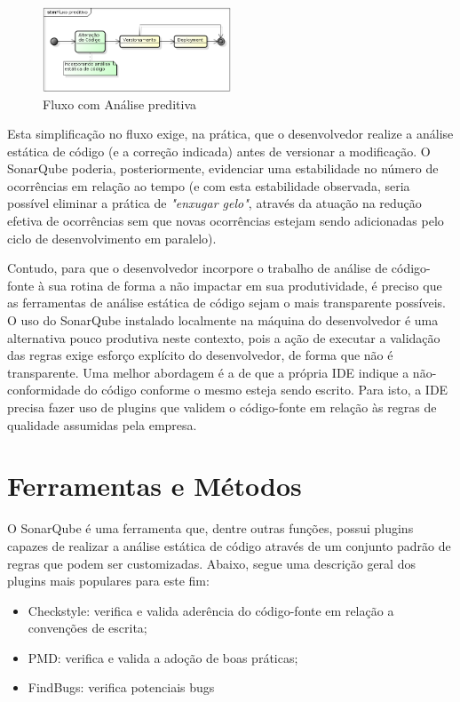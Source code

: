 \documentclass[12pt,journal,compsoc]{IEEEtran}
\begin{document}
\begin{figure}[ht!]
\centering
\includegraphics[width=0.5\textwidth]{img/flow_after}
\caption{Fluxo com Análise preditiva}
\label{flow_after}
\end{figure}

Esta simplificação no fluxo exige, na prática, que o desenvolvedor realize a análise estática de código (e a correção indicada) antes de versionar a modificação\cite{jamesshore_ci_attitude}. O SonarQube poderia, posteriormente, evidenciar uma estabilidade no número de ocorrências em relação ao tempo (e com esta estabilidade observada, seria possível eliminar a prática de \emph{"enxugar gelo"}, através da atuação na redução efetiva de ocorrências sem que novas ocorrências estejam sendo adicionadas pelo ciclo de desenvolvimento em paralelo). 

Contudo, para que o desenvolvedor incorpore o trabalho de análise de código-fonte à sua rotina de forma a não impactar em sua produtividade, é preciso que as ferramentas de análise estática de código sejam o mais transparente possíveis. O uso do SonarQube instalado localmente na máquina do desenvolvedor é uma alternativa pouco produtiva neste contexto, pois a ação de executar a validação das regras exige esforço explícito do desenvolvedor, de forma que não é transparente. Uma melhor abordagem é a de que a própria IDE indique a não-conformidade do código conforme o mesmo esteja sendo escrito. Para isto, a IDE precisa fazer uso de plugins que validem o código-fonte em relação às regras de qualidade assumidas pela empresa. 


\section{Ferramentas e Métodos}

O SonarQube é uma ferramenta que, dentre outras funções, possui plugins capazes de realizar a análise estática de código através de um conjunto padrão de regras que podem ser customizadas. Abaixo, segue uma descrição geral dos plugins mais populares para este fim:

\begin{itemize}
\item Checkstyle: verifica e valida aderência do código-fonte em relação a convenções de escrita;
\item PMD: verifica e valida a adoção de boas práticas;
\item FindBugs: verifica potenciais bugs
\end{itemize}
\end{document}

